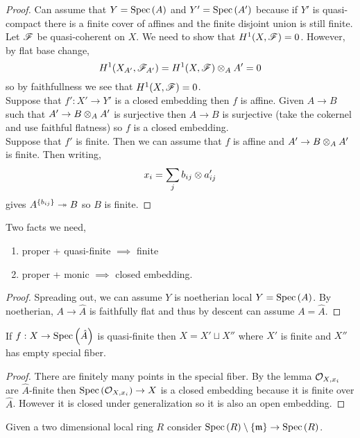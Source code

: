 \documentclass[12pt]{article}
\begin{document}
\begin{proof}
Can assume that $Y = \mathrm{Spec}\left( A \right)$ and $Y' = \mathrm{Spec}\left( A' \right)$ because if $Y'$ is quasi-compact there is a finite cover of affines and the finite disjoint union is still finite. Let $\mathscr{F}$ be quasi-coherent on $X$. We need to show that $H^1(X, \mathscr{F}) = 0$. However, by flat base change,
\[ H^1(X_{A'}, \mathscr{F}_{A'}) = H^1(X, \mathscr{F}) \otimes_A A' = 0 \]
so by faithfullness we see that $H^1(X, \mathscr{F}) = 0$.
\bigskip\\
Suppose that $f' : X' \to Y'$ is a closed embedding then $f$ is affine. Given $A \to B$ such that $A' \to B \otimes_A A'$ is surjective then $A \to B$ is surjective (take the cokernel and use faithful flatness) so $f$ is a closed embedding.
\bigskip\\
Suppose that $f'$ is finite. Then we can assume that $f$ is affine and $A' \to B \otimes_A A'$ is finite. Then writing,
\[ x_i = \sum_j b_{ij} \otimes a'_{ij} \]
gives $A^{\{ b_{ij} \}} \twoheadrightarrow B$ so $B$ is finite.
\end{proof}

\begin{thm}
Two facts we need,
\begin{enumerate}
\item proper + quasi-finite $\implies$ finite
\item proper + monic $\implies$ closed embedding.
\end{enumerate}
\end{thm}

\begin{proof}
Spreading out, we can assume $Y$ is noetherian local $Y = \mathrm{Spec}\left( A \right)$. By noetherian, $A \to \hat{A}$ is faithfully flat and thus by descent can assume $A = \hat{A}$. 
\end{proof}

\begin{lemma}
If $f : X \to \mathrm{Spec}\left( \hat{A} \right)$ is quasi-finite then $X = X' \sqcup X''$ where $X'$ is finite and $X''$ has empty special fiber. 
\end{lemma}


\begin{proof}
There are finitely many points in the special fiber. By the lemma $\mathcal{O}_{X, x_i}$ are $\hat{A}$-finite then $\mathrm{Spec}\left( \mathcal{O}_{X, x_i} \right) \to X$ is a closed embedding because it is finite over $\hat{A}$. However it is closed under generalization so it is also an open embedding. 
\end{proof}

\begin{example}
Given a two dimensional local ring $R$ consider $\mathrm{Spec}\left( R \right) \setminus \{ \mathfrak{m} \} \to \mathrm{Spec}\left( R \right)$. 
\end{example}
\end{document}
